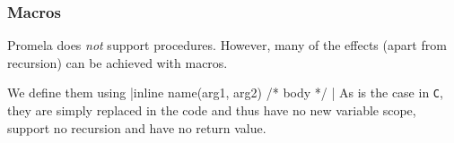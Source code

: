 \subsubsection{Macros}
Promela does \textit{not} support procedures. However, many of the effects (apart from recursion) can be achieved with macros.

We define them using |inline name(arg1, arg2) { /* body */ }|
As is the case in \texttt{C}, they are simply replaced in the code and thus have no new variable scope, support no recursion and have no return value.

